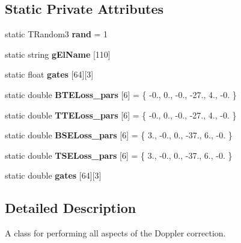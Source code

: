 \subsection*{Static Private Attributes}
\begin{DoxyCompactItemize}
\item 
\mbox{\label{classdoppler_a6b0752081184728b3b927ca03d952589}} 
static T\+Random3 {\bfseries rand} = 1
\item 
\mbox{\label{classdoppler_aaa75d2d9cc2d380f05398fdd7c40581c}} 
static string {\bfseries g\+El\+Name} \mbox{[}110\mbox{]}
\item 
\mbox{\label{classdoppler_a63d9bf44487b4d82fcc414a4d8ab4338}} 
static float {\bfseries gates} \mbox{[}64\mbox{]}\mbox{[}3\mbox{]}
\item 
\mbox{\label{classdoppler_a814add11861b9c0b790103a674afae2c}} 
static double {\bfseries B\+T\+E\+Loss\+\_\+pars} \mbox{[}6\mbox{]} = \{ -\/0., 0., -\/0., -\/27., 4., -\/0. \}
\item 
\mbox{\label{classdoppler_a3da865b4e9545e0967c9136b7e12bd96}} 
static double {\bfseries T\+T\+E\+Loss\+\_\+pars} \mbox{[}6\mbox{]} = \{ -\/0., 0., -\/0., -\/27., 4., -\/0. \}
\item 
\mbox{\label{classdoppler_a5356d14a840882ee136903b040d70e89}} 
static double {\bfseries B\+S\+E\+Loss\+\_\+pars} \mbox{[}6\mbox{]} = \{ 3., -\/0., 0., -\/37., 6., -\/0. \}
\item 
\mbox{\label{classdoppler_a95e5670612ee5ef760d9a35fc0093554}} 
static double {\bfseries T\+S\+E\+Loss\+\_\+pars} \mbox{[}6\mbox{]} = \{ 3., -\/0., 0., -\/37., 6., -\/0. \}
\item 
\mbox{\label{classdoppler_ae4beeefb26d1fe2552b457758fbb7e3d}} 
static double {\bfseries gates} \mbox{[}64\mbox{]}\mbox{[}3\mbox{]}
\end{DoxyCompactItemize}


\subsection{Detailed Description}
A class for performing all aspects of the Doppler correction. 

